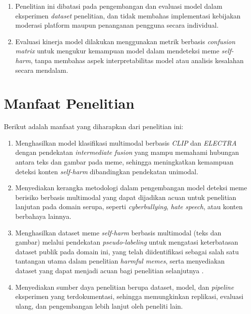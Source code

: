 \begin{enumerate}
    \item Penelitian ini dibatasi pada pengembangan dan evaluasi model dalam eksperimen \textit{dataset} penelitian, dan tidak membahas implementasi kebijakan moderasi platform maupun penanganan pengguna secara individual.
    
    \item Evaluasi kinerja model dilakukan menggunakan metrik berbasis \textit{confusion matrix} untuk mengukur kemampuan model dalam mendeteksi meme \textit{self-harm}, tanpa membahas aspek interpretabilitas model atau analisis kesalahan secara mendalam.
\end{enumerate}

\section{Manfaat Penelitian} \label{I.Manfaat}
Berikut adalah manfaat yang diharapkan dari penelitian ini: \par
\begin{enumerate}
    \item Menghasilkan model klasifikasi multimodal berbasis \textit{CLIP} dan \textit{ELECTRA} dengan pendekatan \textit{intermediate fusion} yang mampu memahami hubungan antara teks dan gambar pada meme, sehingga meningkatkan kemampuan deteksi konten \textit{self-harm} dibandingkan pendekatan unimodal.
    
    \item Menyediakan kerangka metodologi dalam pengembangan model deteksi meme berisiko berbasis multimodal yang dapat dijadikan acuan untuk penelitian lanjutan pada domain serupa, seperti \textit{cyberbullying}, \textit{hate speech}, atau konten berbahaya lainnya.
    
    \item Menghasilkan dataset meme \textit{self-harm} berbasis multimodal (teks dan gambar) melalui pendekatan \textit{pseudo-labeling} untuk mengatasi keterbatasan dataset publik pada domain ini, yang telah diidentifikasi sebagai salah satu tantangan utama dalam penelitian \textit{harmful memes}, serta menyediakan dataset yang dapat menjadi acuan bagi penelitian selanjutnya \cite{Sharma2022HarmfulMemes}.
    
    \item Menyediakan sumber daya penelitian berupa dataset, model, dan \textit{pipeline} eksperimen yang terdokumentasi, sehingga memungkinkan replikasi, evaluasi ulang, dan pengembangan lebih lanjut oleh peneliti lain.
\end{enumerate}


